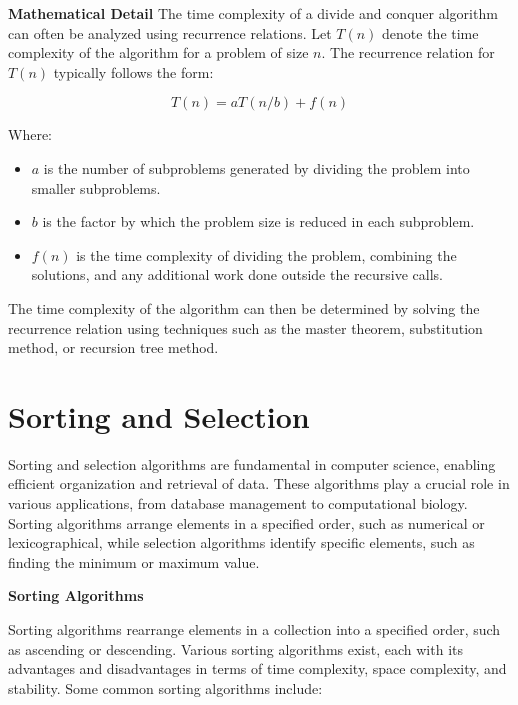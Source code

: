 \documentclass[12pt]{book} %
\begin{document}
\textbf{Mathematical Detail}
\FloatBarrier
The time complexity of a divide and conquer algorithm can often be analyzed using recurrence relations. Let $T(n)$ denote the time complexity of the algorithm for a problem of size $n$. The recurrence relation for $T(n)$ typically follows the form:

\[
T(n) = aT(n/b) + f(n)
\]

Where:
\begin{itemize}
    \item $a$ is the number of subproblems generated by dividing the problem into smaller subproblems.
    \item $b$ is the factor by which the problem size is reduced in each subproblem.
    \item $f(n)$ is the time complexity of dividing the problem, combining the solutions, and any additional work done outside the recursive calls.
\end{itemize}

The time complexity of the algorithm can then be determined by solving the recurrence relation using techniques such as the master theorem, substitution method, or recursion tree method.

\section{Sorting and Selection}

Sorting and selection algorithms are fundamental in computer science, enabling efficient organization and retrieval of data. These algorithms play a crucial role in various applications, from database management to computational biology. Sorting algorithms arrange elements in a specified order, such as numerical or lexicographical, while selection algorithms identify specific elements, such as finding the minimum or maximum value.

\textbf{Sorting Algorithms}

Sorting algorithms rearrange elements in a collection into a specified order, such as ascending or descending. Various sorting algorithms exist, each with its advantages and disadvantages in terms of time complexity, space complexity, and stability. Some common sorting algorithms include:
\end{document}
